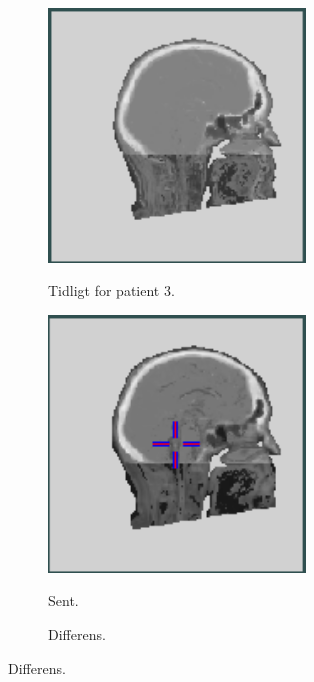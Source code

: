 \begin{figure}
\begin{subfigure}[b]{0.3\textwidth}
        \caption{Tidligt for patient 3.}
        \includegraphics[width=0.75\textwidth]{colager/over_tid_sct/over_tid_sct_210445_early.png}
        \label{col:over_time_sct_pat3_early}
    \end{subfigure}\hfill
    \begin{subfigure}[b]{0.3\textwidth}
        \caption{Sent.}
        \includegraphics[width=0.75\textwidth]{colager/over_tid_sct/over_tid_sct_210445_late.png}
        \label{col:over_time_sct_pat3_late}
    \end{subfigure}\hfill
    \begin{subfigure}[b]{0.3\textwidth}
        \caption{Differens.}

\end{subfigure}
\end{figure}

